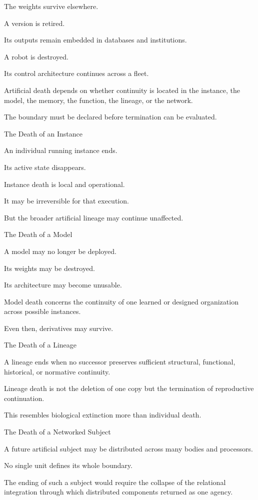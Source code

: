The weights survive elsewhere.

A version is retired.

Its outputs remain embedded in databases and institutions.

A robot is destroyed.

Its control architecture continues across a fleet.

Artificial death depends on whether continuity is located in the instance, the model, the memory, the function, the lineage, or the network.

The boundary must be declared before termination can be evaluated.

The Death of an Instance

An individual running instance ends.

Its active state disappears.

Instance death is local and operational.

It may be irreversible for that execution.

But the broader artificial lineage may continue unaffected.

The Death of a Model

A model may no longer be deployed.

Its weights may be destroyed.

Its architecture may become unusable.

Model death concerns the continuity of one learned or designed organization across possible instances.

Even then, derivatives may survive.

The Death of a Lineage

A lineage ends when no successor preserves sufficient structural, functional, historical, or normative continuity.

Lineage death is not the deletion of one copy but the termination of reproductive continuation.

This resembles biological extinction more than individual death.

The Death of a Networked Subject

A future artificial subject may be distributed across many bodies and processors.

No single unit defines its whole boundary.

The ending of such a subject would require the collapse of the relational integration through which distributed components returned as one agency.

